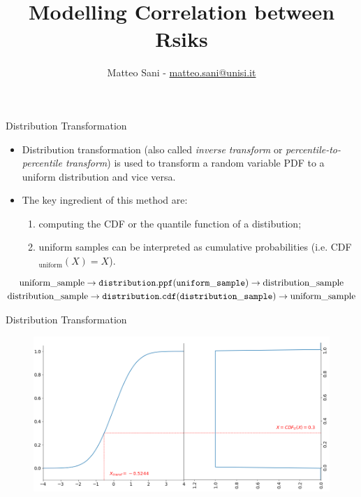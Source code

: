 \documentclass{beamer}
\title{Modelling Correlation between Rsiks}
\author{Matteo Sani - \href{mailto:matteo.sani@unisi.it}{matteo.sani@unisi.it}}
\begin{document}
\begin{frame}[plain]
	\maketitle
\end{frame}

\begin{frame}{Distribution Transformation}
  \begin{itemize}
  \item Distribution transformation (also called \emph{inverse transform} or \emph{percentile-to-percentile transform}) is used to transform a random variable PDF to a uniform distribution and vice versa.
  \item The key ingredient of this method are:
    \begin{enumerate}
      \item computing the CDF or the quantile function of a distibution;
      \item uniform samples can be interpreted as cumulative probabilities (i.e.  CDF$_{\textrm{uniform}}(X)=X$).
    \end{enumerate}
  \end{itemize}

  \begin{equation*}
    \begin{gathered}
      \textrm{uniform\_sample} \rightarrow \tt{distribution.ppf(uniform\_sample)} \rightarrow \textrm{distribution\_sample}\\
      \textrm{distribution\_sample} \rightarrow \tt{distribution.cdf(distribution\_sample)} \rightarrow \textrm{uniform\_sample}
    \end{gathered}
  \end{equation*}
\end{frame}

\begin{frame}{Distribution Transformation}
  \begin{figure}[h]
    \begin{center}
    \includegraphics[width=0.7\linewidth]{ppf_transform}
    \end{center}
  \end{figure}    
\end{frame}
\end{document}
